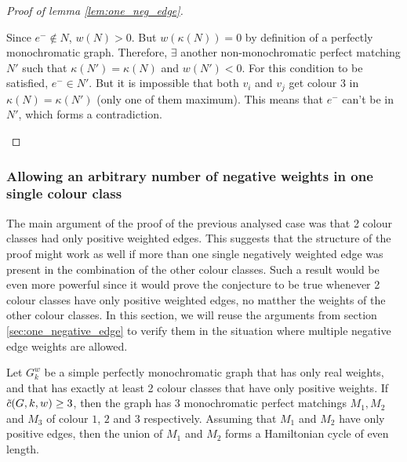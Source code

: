 \begin{proof}[Proof of lemma \ref{lem:one_neg_edge}]
\begin{enumerate}
\begin{enumerate}
            Since $e^- \notin N$, $w(N) > 0$. But $w(\kappa(N)) = 0$ by definition of a perfectly monochromatic graph. Therefore, $\exists$ another non-monochromatic perfect matching $N'$ such that $\kappa(N') = \kappa(N)$ and $w(N') < 0$. For this condition to be satisfied, $e^- \in N'$. But it is impossible that both $v_i$ and $v_j$ get colour $3$ in $\kappa(N) = \kappa(N')$ (only one of them maximum). This means that $e^-$ can't be in $N'$, which forms a contradiction.
        \end{enumerate}
    \end{enumerate}

\end{proof}

\subsubsection{Allowing an arbitrary number of negative weights in one single colour class}

The main argument of the proof of the previous analysed case was that 2 colour classes had only positive weighted edges. This suggests that the structure of the proof might work as well if more than one single negatively weighted edge was present in the combination of the other colour classes. Such a result would be even more powerful since it would prove the conjecture to be true whenever 2 colour classes have only positive weighted edges, no matther the weights of the other colour classes. In this section, we will reuse the arguments from section \ref{sec:one_negative_edge} to verify them in the situation where multiple negative edge weights are allowed.

\begin{observation}
    \label{obs:2_positive_classes_ham_cycle}
    Let $G_k^w$ be a simple perfectly monochromatic graph that has only real weights, and that has exactly at least 2 colour classes that have only positive weights. If $\Tilde{c}(G, k, w) \geq 3$, then the graph has $3$ monochromatic perfect matchings $M_1, M_2$ and $M_3$ of colour $1$, $2$ and $3$ respectively. Assuming that $M_1$ and $M_2$ have only positive edges, then the union of $M_1$ and $M_2$ forms a Hamiltonian cycle of even length.
\end{observation}

